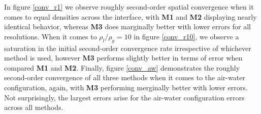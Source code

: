 In figure \ref{conv_r1} we observe roughly second-order spatial convergence when it comes to equal densities across the interface, with \textbf{M1} and \textbf{M2} displaying nearly identical behavior, whereas \textbf{M3} does marginally better with lower errors for all resolutions. When it comes to $\rho_l / \rho_g = 10$ in figure \ref{conv_r10}, we observe a saturation in the initial second-order convergence rate irrespective of whichever method is used, however \textbf{M3} performs slightly better in terms of error when compared \textbf{M1} and \textbf{M2}. Finally, figure \ref{conv_aw} demonstrates the roughly second-order convergence of all three methods when it comes to the air-water configuration, again, with \textbf{M3} performing merginally better with lower errors. Not surprisingly, the largest errors arise for the air-water configuration errors across all methods. 


